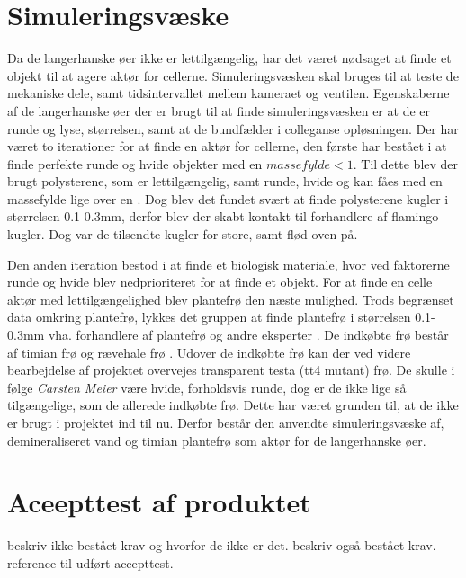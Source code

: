  




\section{Simuleringsvæske}
\label{sec:simuleringsv}
Da de langerhanske øer ikke er lettilgængelig, har det været nødsaget at finde et objekt til at agere aktør for cellerne. Simuleringsvæsken skal bruges til at teste de mekaniske dele, samt tidsintervallet mellem kameraet og ventilen. Egenskaberne af de langerhanske øer der er brugt til at finde simuleringsvæsken er at de er runde og lyse, størrelsen, samt at de bundfælder i colleganse opløsningen. Der har været to iterationer for at finde en aktør for cellerne, den første har bestået i at finde perfekte runde og hvide objekter med en $massefylde<1$. Til dette blev der brugt polysterene, som er lettilgængelig, samt runde, hvide og kan fåes med en massefylde lige over en . Dog blev det fundet svært at finde polysterene kugler i størrelsen 0.1-0.3mm, derfor blev der skabt kontakt til forhandlere af flamingo kugler. Dog var de tilsendte kugler for store, samt flød oven på. 

Den anden iteration bestod i at finde et biologisk materiale, hvor ved faktorerne runde og hvide blev nedprioriteret for at finde et objekt. For at finde en celle aktør med lettilgængelighed blev plantefrø den næste mulighed. Trods begrænset data omkring plantefrø, lykkes det gruppen at finde plantefrø i størrelsen 0.1-0.3mm vha. forhandlere af plantefrø og andre eksperter . De indkøbte frø består af timian frø og rævehale frø . Udover de indkøbte frø kan der ved videre bearbejdelse af projektet overvejes transparent testa (tt4 mutant) frø. De skulle i følge \textit{Carsten Meier} være hvide, forholdsvis runde, dog er de ikke lige så tilgængelige, som de allerede indkøbte frø. Dette har været grunden til, at de ikke er brugt i projektet ind til nu. Derfor består den anvendte simuleringsvæske af, demineraliseret vand og timian plantefrø som aktør for de langerhanske øer.  
 
\section{Aceepttest af produktet} 
 beskriv ikke bestået krav og hvorfor de ikke er det. beskriv også bestået krav. reference til udført accepttest.

